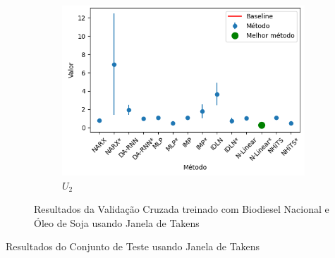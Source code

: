 \begin{figure}[htbp]
\begin{subfigure}[b]{0.3\textwidth}
		\includegraphics[width=\textwidth]{figuras/u2_takens_brasil_oil_results.png}
		\caption{\(U_2\)}
		\label{fig:u2_takens_brasil_oil_results}
	\end{subfigure}
	\caption{Resultados da Validação Cruzada treinado com Biodiesel Nacional e Óleo de Soja usando Janela de Takens}
	\label{fig:takens_brasil_oil_results}
\end{figure}
\begin{table}[ht]
	\centering
	\caption{Resultados do Conjunto de Teste usando Janela de Takens}
	\label{tab:resultados_teste_takens}
	\begin{adjustbox}{angle=90, scale=0.65}
		
	\end{adjustbox}
\end{table}

